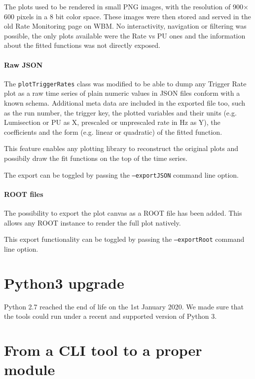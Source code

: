 The plots used to be rendered in small PNG images, with the resolution of 900$\times$600 pixels in a 8 bit color space. These images were then stored and served in the old Rate Monitoring page on WBM. No interactivity, navigation or filtering was possible, the only plots available were the Rate vs PU ones and the information about the fitted functions was not directly exposed.

\paragraph{Raw JSON}

The \texttt{plotTriggerRates} class was modified \cite{RootexporttoggleJSONexportfunction6MergeRequestsCMSTSGFOGratemonGitLab-2020-10-07} to be able to dump any Trigger Rate plot as a raw time series of plain numeric values in JSON files conform with a known schema. Additional meta data are included in the exported file too, such as the run number, the trigger key, the plotted variables and their units (e.g. Lumisection or PU as X, prescaled or unprescaled rate in Hz as Y), the coefficients and the form (e.g. linear or quadratic) of the fitted function.

This feature enables any plotting library to reconstruct the original plots and possibily draw the fit functions on the top of the time series.

The export can be toggled by passing the \texttt{--exportJSON} command line option.

\paragraph{ROOT files}

The possibility to export the plot canvas as a ROOT file has been added. This allows any ROOT instance to render the full plot natively.

This export functionality can be toggled by passing the \texttt{--exportRoot} command line option.

\section{Python3 upgrade}

Python 2.7 reached the end of life on the 1st January 2020. We made sure \cite{Python3migration4MergeRequestsCMSTSGFOGratemonGitLab-2020-10-07} that the tools could run under a recent and supported version of Python 3.

\section{From a CLI tool to a proper module}

